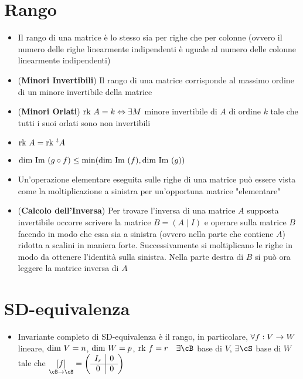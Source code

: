 \documentclass[a4paper,NoNotes,GeneralMath]{stdmdoc}
\newcommand{\mtrapp}[3]{\underset{ {{#2} \rar {#3}} }{ \left[ {#1} \right]}}
\begin{document}
	\section*{Rango}
	\begin{itemize}
		\item Il rango di una matrice è lo stesso sia per righe che per colonne (ovvero il numero delle righe linearmente indipendenti è uguale al numero delle colonne linearmente indipendenti)
		\item ({\bf Minori Invertibili}) Il rango di una matrice corrisponde al massimo ordine di un minore invertibile della matrice
		\item ({\bf Minori Orlati}) $\mbox{rk } A = k \Leftrightarrow \exists M$ minore invertibile di $A$ di ordine $k$ tale che tutti i suoi orlati sono non invertibili
		\item $\mbox{rk } A = \mbox{rk } {}^tA$
		\item $\mbox{dim } \mbox{Im } (g\circ f) \le \min(\mbox{dim } \mbox{Im }(f), \mbox{dim } \mbox{Im }(g))$
		\item Un'operazione elementare eseguita sulle righe di una matrice può essere vista come la moltiplicazione a sinistra per un'opportuna matrice "elementare"
		\item ({\bf Calcolo dell'Inversa}) Per trovare l'inversa di una matrice $A$ supposta invertibile occorre scrivere la matrice $B = \left( A \mid I \right)$ e operare sulla matrice $B$ facendo in modo che essa sia a sinistra (ovvero nella parte che contiene $A$) ridotta a scalini in maniera forte. Successivamente si moltiplicano le righe in modo da ottenere l'identità sulla sinistra. Nella parte destra di $B$ si può ora leggere la matrice inversa di $A$
	\end{itemize}

	\section*{SD-equivalenza}
	\begin{itemize}
		\item Invariante completo di SD-equivalenza è il rango, in particolare, $\forall f:V \rightarrow W$ lineare, $\mbox{dim } V = n$, $\mbox{dim } W = p$, $\Rk f = r \quad \exists \cB$ base di $V$, $\exists \cS$ base di $W$ tale che $\mtrapp{f}{\cB}{\cS} = \left( \begin{array}{c|c} I_r & 0 \\ \hline 0 & 0 \\ \end{array} \right)$
	\end{itemize}
	
\end{document}
